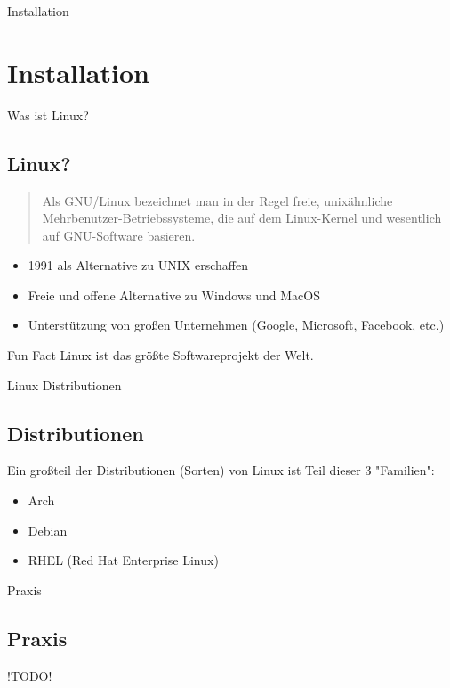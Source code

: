 
\begin{frame}{Installation}
    \section{Installation}\label{sec:installation}
\end{frame}

\begin{frame}{Was ist Linux?}
    \subsection{Linux?}\label{subsec:linux?}

    \begin{quote}
        Als GNU/Linux bezeichnet man in der Regel freie, unixähnliche Mehrbenutzer-Betriebssysteme, die auf dem Linux-Kernel und wesentlich auf GNU-Software basieren.
    \end{quote}

    \begin{itemize}
        \item 1991 als Alternative zu UNIX erschaffen\pause
        \item Freie und offene Alternative zu Windows und MacOS\pause
        \item Unterstützung von großen Unternehmen (Google, Microsoft, Facebook, etc.)
    \end{itemize}
    \begin{alertblock}{Fun Fact}
        Linux ist das größte Softwareprojekt der Welt.
    \end{alertblock}

\end{frame}

\begin{frame}{Linux Distributionen}
    \subsection{Distributionen}\label{subsec:distributionen}

    Ein großteil der Distributionen (Sorten) von Linux ist Teil dieser 3 "Familien":

    \begin{itemize}
        \item Arch
        \item Debian
        \item RHEL (Red Hat Enterprise Linux)
    \end{itemize}

\end{frame}

\begin{frame}{Praxis}
    \subsection{Praxis}\label{subsec:praxis}

    !TODO!

\end{frame}